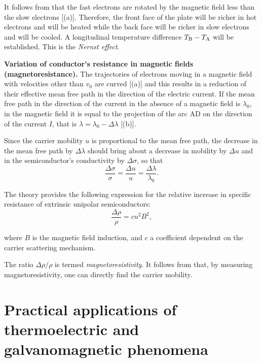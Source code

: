\noindent
It follows from  that the fast electrons are rotated by the magnetic field less than the slow electrons [(a)]. Therefore, the front face of the plate will be richer in hot electrons and will be heated while the back face will be richer in slow electrons and will be cooled. A longitudinal temperature difference $T_{\text{B}}-T_{\text{A}}$ will be established. This is the \textit{Nernst effect}.

\textbf{Variation of conductor's resistance in magnetic fields (magnetoresistance).} The trajectories of electrons moving in a magnetic field with velocities other than $v_0$ are curved [(a)] and this results in a reduction of their effective mean free path in the direction of the electric current. If the mean free path in the direction of the current in the absence of a magnetic field is $\lambda_0$, in the magnetic field it is equal to the projection of the arc AD on the direction of the current $I$, that is $\lambda=\lambda_0-\Delta{\lambda}$ [(b)].

Since the carrier mobility $u$ is proportional to the mean free path, the decrease in the mean free path by $\Delta{\lambda}$ should bring about a decrease in mobility by $\Delta{u}$ and in the semiconductor's conductivity by $\Delta{\sigma}$, so that
\begin{equation*}
    \frac{\Delta{\sigma}}{\sigma} = \frac{\Delta{u}}{u} = \frac{\Delta{\lambda}}{\lambda_0}.
\end{equation*}

The theory provides the following expression for the relative increase in specific resistance of extrinsic unipolar semiconductors:
\begin{equation}\label{eq:9_41}
    \frac{\Delta{\rho}}{\rho} = c u^2 B^2,
\end{equation}

\noindent
where $B$ is the magnetic field induction, and $c$ a coefficient dependent on the carrier scattering mechanism.

The ratio $\Delta{\rho}/\rho$ is termed \textit{magnetoresistivity}. It follows from  that, by measuring magnetoresistivity, one can directly find the carrier mobility.

\section{Practical applications of thermoelectric
and galvanomagnetic phenomena}\label{sec:83}

